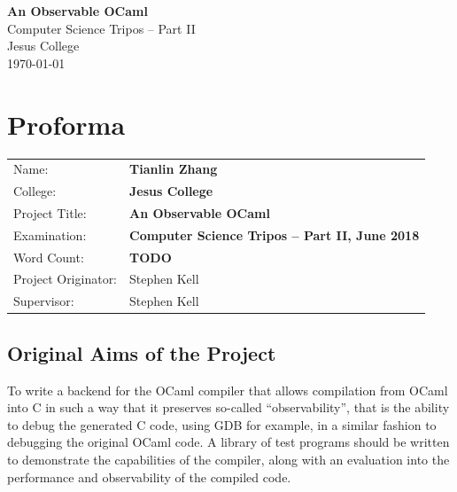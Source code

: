 \documentclass[12pt,a4paper,twoside,openright]{report}
\begin{document}





\pagestyle{empty}


\vspace*{60mm}
\begin{center}
\Huge
\textbf{An Observable OCaml} \\[5mm]
Computer Science Tripos -- Part II \\[5mm]
Jesus College \\[5mm]
\today  %
\end{center}


\pagestyle{plain}

\chapter*{Proforma}

{\large
\begin{tabular}{ll}
Name:               & \bf Tianlin Zhang \\
College:            & \bf Jesus College\\
Project Title:      & \bf An Observable OCaml\\
Examination:        & \bf Computer Science Tripos -- Part II, June 2018  \\
Word Count:         & \bf TODO\footnotemark[1]  \\
Project Originator: & Stephen Kell \\
Supervisor:         & Stephen Kell \\ 
\end{tabular}
}


\section*{Original Aims of the Project}

To write a backend for the OCaml compiler that allows compilation from OCaml 
into C in such a way that it preserves so-called ``observability'', that is the 
ability to debug the generated C code, using GDB for example, in a similar 
fashion to debugging the original OCaml code. A library of test programs should 
be written to demonstrate the capabilities of the compiler, along with an 
evaluation into the performance and observability of the compiled code.
\end{document}
